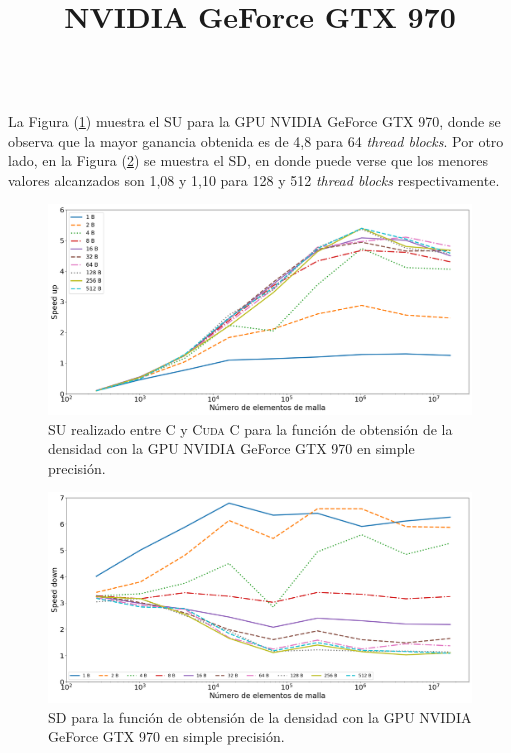 \newpage
%
\title{\textbf{NVIDIA GeForce GTX 970}}\\

La Figura (\ref{fig:s_cuda_970_test_simple_10}) muestra el SU para la GPU NVIDIA GeForce GTX 970, donde se observa que la mayor ganancia obtenida es de 4,8 para 64 \textit{thread blocks}. Por otro lado, en la Figura (\ref{fig:s_py_970_test_simple_10}) se muestra el SD, en donde puede verse que los menores valores alcanzados son 1,08 y 1,10 para 128 y 512  \textit{thread blocks} respectivamente.


\begin{figure}[h!]
	\centering
	\includegraphics[width=\textwidth]{figs/cap4/s_cuda_970_test_simple_10}
	\caption{SU realizado entre \textsc{C} y \textsc{Cuda C} para la función de obtensión de la densidad con la GPU NVIDIA GeForce GTX 970 en simple precisión.} 
	\label{fig:s_cuda_970_test_simple_10}	
\end{figure}

\begin{figure}[h!]
	\centering
	\includegraphics[width=\textwidth]{figs/cap4/s_py_970_test_simple_10}
	\caption{SD para la función de obtensión de la densidad con la GPU NVIDIA GeForce GTX 970 en simple precisión.} 
	\label{fig:s_py_970_test_simple_10}	
\end{figure}

